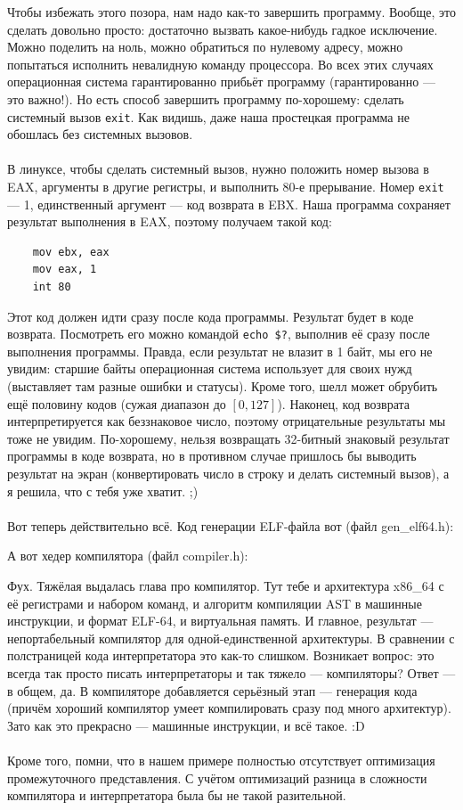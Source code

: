 \documentclass[11pt]{book}
\begin{document}
Чтобы избежать этого позора, нам надо как-то завершить программу.
Вообще, это сделать довольно просто: достаточно вызвать какое-нибудь гадкое исключение.
Можно поделить на ноль,
можно обратиться по нулевому адресу,
можно попытаться исполнить невалидную команду процессора.
Во всех этих случаях операционная система гарантированно прибьёт программу (гарантированно --- это важно!).
Но есть способ завершить программу по-хорошему: сделать системный вызов \texttt{exit}.
Как видишь, даже наша простецкая программа не обошлась без системных вызовов.
\\ \\
В линуксе, чтобы сделать системный вызов, нужно положить номер вызова в EAX,
аргументы в другие регистры, и выполнить 80-е прерывание.
Номер \texttt{exit} --- 1, единственный аргумент --- код возврата в EBX.
Наша программа сохраняет результат выполнения в EAX, поэтому получаем такой код:
\begin{verbatim}
    mov ebx, eax
    mov eax, 1
    int 80
\end{verbatim}
Этот код должен идти сразу после кода программы.
Результат будет в коде возврата.
Посмотреть его можно командой \texttt{echo \$?}, выполнив её сразу после выполнения программы.
Правда, если результат не влазит в 1 байт, мы его не увидим:
старшие байты операционная система использует для своих нужд (выставляет там разные ошибки и статусы).
Кроме того, шелл может обрубить ещё половину кодов (сужая диапазон до $[0, 127]$).
Наконец, код возврата интерпретируется как беззнаковое число, поэтому отрицательные результаты мы тоже не увидим.
По-хорошему, нельзя возвращать 32-битный знаковый результат программы в коде возврата,
но в противном случае пришлось бы выводить результат на экран (конвертировать число в строку и делать системный вызов),
а я решила, что с тебя уже хватит. ;)
\\ \\
Вот теперь действительно всё.
Код генерации ELF-файла вот (файл gen\_elf64.h):

А вот хедер компилятора (файл compiler.h):

Фух. Тяжёлая выдалась глава про компилятор.
Тут тебе и архитектура x86\_64 с её регистрами и набором команд,
и алгоритм компиляции AST в машинные инструкции, и формат ELF-64, и виртуальная память.
И главное, результат --- непортабельный компилятор для одной-единственной архитектуры.
В сравнении с полстраницей кода интерпретатора это как-то слишком.
Возникает вопрос: это всегда так просто писать интерпретаторы и так тяжело --- компиляторы?
Ответ --- в общем, да.
В компиляторе добавляется серьёзный этап --- генерация кода (причём хороший компилятор умеет компилировать сразу под много архитектур).
Зато как это прекрасно --- машинные инструкции, и всё такое. :D
\\ \\
Кроме того, помни, что в нашем примере полностью отсутствует оптимизация промежуточного представления.
С учётом оптимизаций разница в сложности компилятора и интерпретатора была бы не такой разительной.
\end{document}
